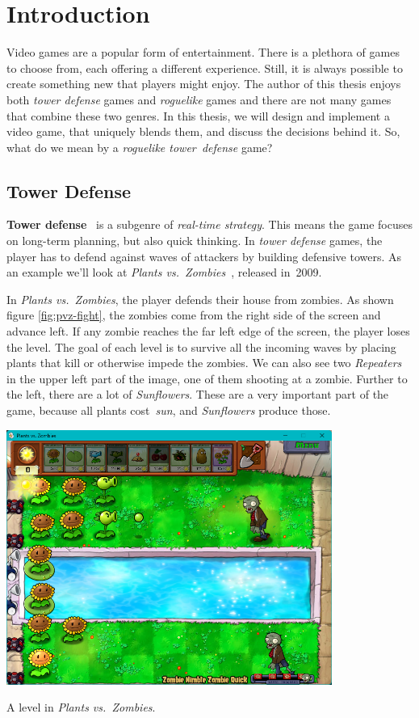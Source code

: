 \chapter{Introduction}

Video games are a popular form of entertainment.
There is a plethora of games to choose from, each offering a different experience.
Still, it is always possible to create something new that players might enjoy.
The author of this thesis enjoys both \emph{tower defense} games and \emph{roguelike} games and there are not many games that combine these two genres.
In this thesis, we will design and implement a video game, that uniquely blends them, and discuss the decisions behind it.
So, what do we mean by a \emph{roguelike tower~defense} game?

\section{Tower Defense}

\textbf{Tower defense}~\cite{TDWiki}  is a subgenre of \emph{real-time strategy}.
This means the game focuses on long-term planning, but also quick thinking.
In \emph{tower defense} games, the player has to defend against waves of attackers by building defensive towers.
As an example we'll look at \emph{Plants vs.\ Zombies}~\cite{PvZWiki}, released in~2009.

In \emph{Plants vs.\ Zombies}, the player defends their house from zombies.
As shown figure \ref{fig:pvz-fight}, the zombies come from the right side of the screen and advance left.
If any zombie reaches the far left edge of the screen, the player loses the level.
The goal of each level is to survive all the incoming waves by placing plants that kill or otherwise impede the zombies.
We can also see two \emph{Repeaters} in the upper left part of the image, one of them shooting at a zombie.
Further to the left, there are a lot of \emph{Sunflowers}.
These are a very important part of the game, because all plants cost~\emph{sun}, and \emph{Sunflowers} produce those.

\begin{center}
    \captionsetup{type=figure}
    \includegraphics[width=0.8\textwidth]{img/Plants-vs-Zombies-Fight.png}
    \caption{A level in \emph{Plants vs.\ Zombies}.}
    \label{fig:pvz-fight}
\end{center}

